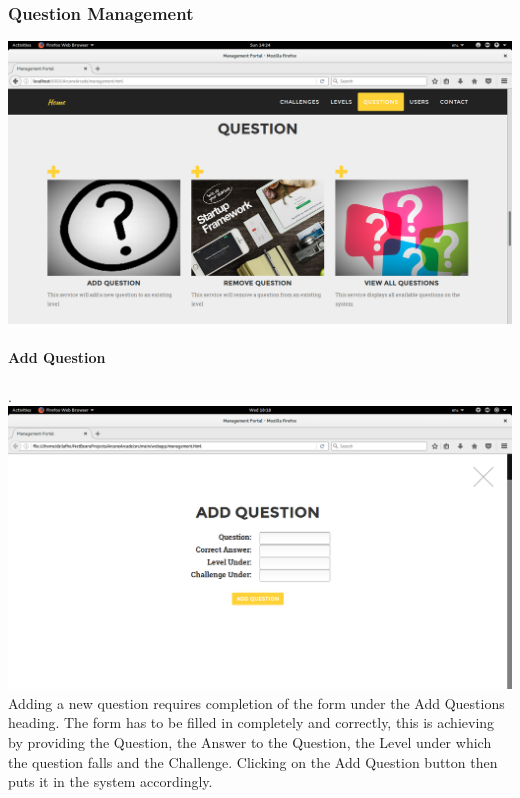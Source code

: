 \documentclass[english]{article}
\begin{document}
				
			
			
			\subsubsection{Question Management}
				\includegraphics[width=\linewidth]{Ques.png}				\newline

					\paragraph{Add Question}. \\ \newline			
				\includegraphics[width=\linewidth]{AddQuestion.png}				\newline
Adding a new question requires completion of the form under the Add Questions heading. The form has to be filled in completely and correctly, this is achieving by providing the Question, the Answer to the Question, the Level under which the question falls and the Challenge. Clicking on the Add Question button then puts it in the system accordingly.
				\\[12pt]\newline
\end{document}
